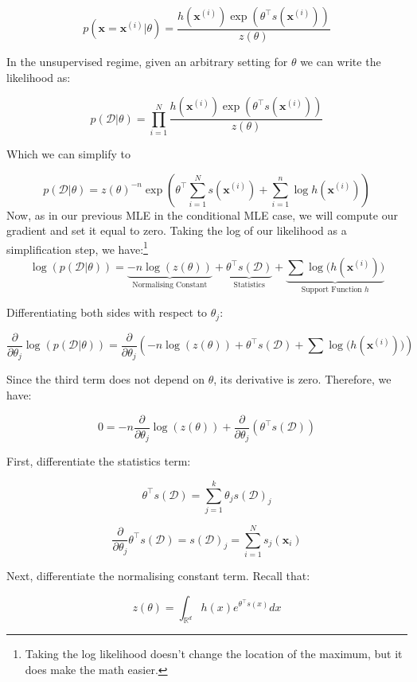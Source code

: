 \[
    p(\mathbf{x}=\boldsymbol{x}^{(i)}|\theta)=\frac{h(\boldsymbol{x}^{(i)})\exp(\theta^\top s(\boldsymbol{x}^{(i)}))}{z(\theta)}
\]

In the unsupervised regime, given an arbitrary setting for $\theta$ we can write the likelihood as:

\[
    p(\mathcal{D}|\theta)=\prod_{i=1}^N\frac{h(\boldsymbol{x}^{(i)})\exp(\theta^\top s(\boldsymbol{x}^{(i)}))}{z(\theta)}
\]

Which we can simplify to

\[
    p(\mathcal{D}|\theta) = z(\theta)^{-n}\exp\left(\theta^\top\sum_{i=1}^Ns(\boldsymbol{x}^{(i)}) + \sum_{i=1}^n\log h(\boldsymbol{x}^{(i)})\right)
\]
Now, as in our previous MLE in the conditional MLE case, we will compute our gradient and set it equal to zero. Taking the log of our likelihood as a simplification step, we have:\footnote{Taking the log likelihood doesn't change the location of the maximum, but it does make the math easier.}
\[
    \log(p(\mathcal{D}|\theta)) = \underbrace{-n\log(z(\theta))}_{\text{Normalising Constant}} + \underbrace{\theta^\top s(\mathcal{D})}_{\text{Statistics}} + \underbrace{\sum\log\bigl(h(\boldsymbol{x}^{(i)})\bigr)}_{\text{Support Function } h}
\]



Differentiating both sides with respect to \( \theta_j \):

\[
    \frac{\partial}{\partial \theta_j} \log(p(\mathcal{D}|\theta)) = \frac{\partial}{\partial \theta_j} \left( -n\log(z(\theta)) + \theta^\top s(\mathcal{D}) + \sum\log\bigl(h(\boldsymbol{x}^{(i)})\bigr) \right )
\]

Since the third term does not depend on \( \theta \), its derivative is zero. Therefore, we have:

\[
    0 = -n \frac{\partial}{\partial \theta_j} \log(z(\theta)) + \frac{\partial}{\partial \theta_j} \left( \theta^\top s(\mathcal{D}) \right )
\]

First, differentiate the statistics term:

\[
    \theta^\top s(\mathcal{D}) = \sum_{j=1}^{k} \theta_j s(\mathcal{D})_j
\]

\[
    \frac{\partial}{\partial \theta_j} \theta^\top s(\mathcal{D}) = s(\mathcal{D})_j = \sum_{i=1}^N s_j(\boldsymbol{x}_i)
\]

Next, differentiate the normalising constant term. Recall that:

\[
    z(\theta) = \int_{\mathbb{R}^d} h(x) e^{\theta^{\top}s(x)} dx
\]


